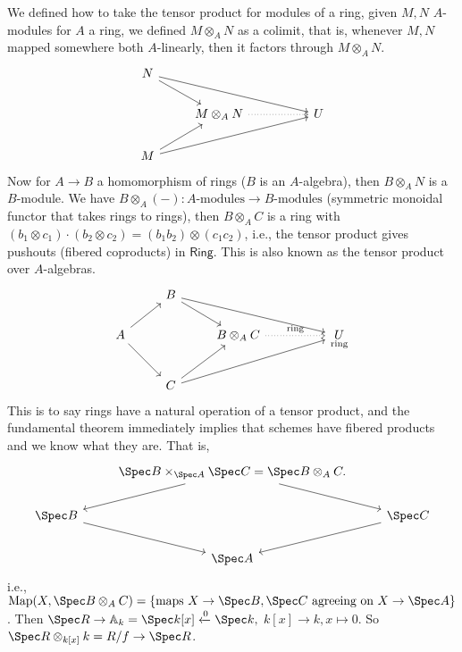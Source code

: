 We defined how to take the tensor product for modules of a ring, given $M,N$ $A$-modules for $A$ a ring, we defined $M \otimes_A N$ as a colimit, that is, whenever $M,N$ mapped somewhere both $A$-linearly, then it factors through $M \otimes_A N$. \[
\begin{tikzcd}
N \arrow[rd] \arrow[rrrd] &                                &  &   \\
                          & M\otimes_AN \arrow[rr, dotted] &  & U \\
M \arrow[ru] \arrow[rrru] &                                &  &  
\end{tikzcd}
\] Now for $A \to B$ a homomorphism of rings ($B $ is an $A$-algebra), then $B \otimes_AN $ is a $B$-module. We have $B \otimes_A (-) \colon A\text{-modules}  \to B\text{-modules} $ (symmetric monoidal functor that takes rings to rings), then $B\otimes_AC$ is a ring with $(b_1 \otimes c_1) \cdot (b_2 \otimes c_2)=(b_1b_2)\otimes (c_1c_2)$, i.e., the tensor product gives pushouts (fibered coproducts) in $\mathsf{Ring} $. This is also known as the tensor product over $A$-algebras.
\[
\begin{tikzcd}
                        & B \arrow[rd] \arrow[rrrd] &                                               &  &                           \\
A \arrow[ru] \arrow[rd] &                           & B\otimes_AC \arrow[rr, "\text{ring}", dotted] &  & \underset{\text{ring}}{U} \\
                        & C \arrow[ru] \arrow[rrru] &                                               &  &                          
\end{tikzcd}
\] This is to say rings have a natural operation of a tensor product, and the fundamental theorem immediately implies that schemes have fibered products and we know what they are. That is, \[
\begin{tikzcd}
                   & \Spec B \times _{\Spec A}\Spec C= \Spec B\otimes _A C. \arrow[ld] \arrow[rd] &                    \\
\Spec B \arrow[rd] &                                                                              & \Spec C \arrow[ld] \\
                   & \Spec A                                                                      &                   
\end{tikzcd}
\] i.e., $\mathrm{Map} (X, \Spec B \otimes_AC) = \{ \text{maps} \ X \to \Spec B,\Spec C \ \text{agreeing on}\ X\to \Spec A \}$. Then $\Spec R \to \A_k = \Spec k[x] \xleftarrow{0}\Spec k ,$ $k[x] \to k, x \mapsto  0$. So $\Spec R \otimes _{k[x]}k =R /f\to \Spec R$.

